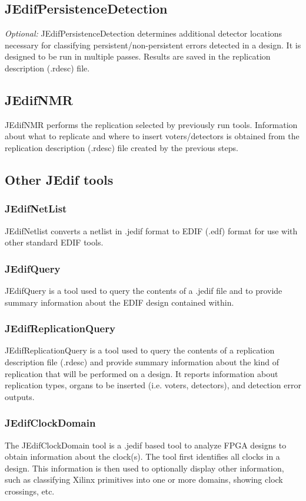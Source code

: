 \documentclass[english]{article}
\numberwithin{figure}{section}
\begin{document}
\subsection{JEdifPersistenceDetection}
\emph{Optional:} JEdifPersistenceDetection determines additional
detector locations necessary for classifying persistent/non-persistent
errors detected in a design. It is designed to be run in multiple
passes. Results are saved in the replication description (.rdesc) file.

\subsection{JEdifNMR}
JEdifNMR performs the replication selected by previously run
tools. Information about what to replicate and where to insert
voters/detectors is obtained from the replication description (.rdesc)
file created by the previous steps.

\subsection{Other JEdif tools}

\subsubsection{JEdifNetList}
JEdifNetlist converts a netlist in .jedif format to EDIF (.edf) format for use
with other standard EDIF tools.

\subsubsection{JEdifQuery}
JEdifQuery is a tool used to query the contents of a .jedif file and
to provide summary information about the EDIF design contained within.

\subsubsection{JEdifReplicationQuery}
JEdifReplicationQuery is a tool used to query the contents of a
replication description file (.rdesc) and provide summary information
about the kind of replication that will be performed on a design. It
reports information about replication types, organs to be inserted
(i.e. voters, detectors), and detection error outputs.

\subsubsection{JEdifClockDomain} 
The JEdifClockDomain tool is a .jedif based tool to analyze FPGA
designs to obtain information about the clock(s). The tool first
identifies all clocks in a design. This information is then used to
optionally display other information, such as classifying Xilinx
primitives into one or more domains, showing clock crossings, etc.
\end{document}
